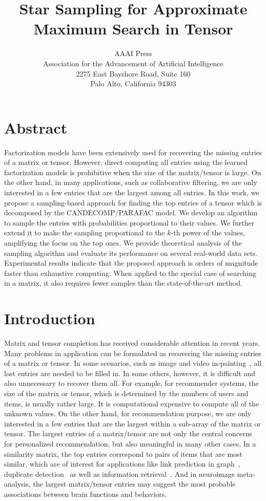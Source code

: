 \documentclass[letterpaper]{article}
\title{Star Sampling for Approximate Maximum Search in Tensor}
\author{AAAI Press\\
Association for the Advancement of Artificial Intelligence\\
2275 East Bayshore Road, Suite 160\\
Palo Alto, California 94303\\
}
\begin{document}
\maketitle
\section{Abstract}
Factorization models have been extensively used for 
recovering the missing entries of a matrix or tensor. 
However, direct computing all entries 
using the learned factorization models is prohibitive 
when the size of the matrix/tensor is large. 
On the other hand, in many applications, 
such as collaborative filtering, 
we are only interested in a few entries that are the largest among all entries. 
In this work, we propose a sampling-based approach for finding the top entries of a tensor 
which is decomposed by the CANDECOMP/PARAFAC model. 
We develop an algorithm to sample the entries with probabilities proportional to their values. 
We further extend it to make the sampling proportional to the $k$-th power of the values, 
amplifying the focus on the top ones. 
We provide theoretical analysis of the sampling algorithm and evaluate its performance on several real-world data sets. 
Experimental results indicate that the proposed approach is orders of magnitude faster than exhaustive computing. 
When applied to the special case of searching in a matrix, 
it also requires fewer samples than the state-of-the-art method.

\section{Introduction}
Matrix and tensor completion has received considerable attention in recent years. 
Many problems in application can be formulated 
as recovering the missing entries of a matrix or tensor. 
In some scenarios, such as image and video in-painting~\cite{Ankita14}, 
all lost entries are needed to be filled in. 
In some others, however, it is difficult and also unnecessary to recover them all. 
For example, for recommender systems, the size of the matrix or tensor, 
which is determined by the numbers of users and items, is usually rather large. 
It is computational expensive to compute all of the unknown values. 
On the other hand, for recommendation purpose, 
we are only interested in a few entries that are the largest within a sub-array of the matrix or tensor. 
The largest entries of a matrix/tensor are not only the central concerns for personalized recommendation, 
but also meaningful in many other cases. 
In a similarity matrix, the top entries correspond to pairs of items that are most similar, 
which are of interest for applications like link prediction in graph~\cite{LibenNowell07}, 
duplicate detection~\cite{Ke2010} as well as information retrieval~\cite{Salton03IR}. 
And in neuroimage meta-analysis, 
the largest matrix/tensor entries may suggest the most probable associations between brain functions and behaviors.
\end{document}
